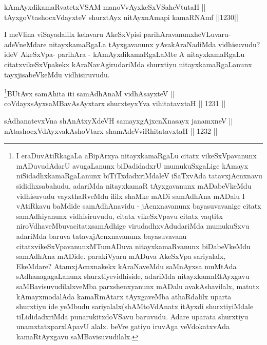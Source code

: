 \begin{shl}
kAmAyxdikamaRvatetxVSAM manoVvAyxkeSxVSaheVtutaH || \\
tAyxgoV\s tashocxVdayxteV shurxtAyx nitAyxnAmapi kamaRNAmf \hfill ||1230||  
\end{shl}

\begin{artha}
I meVlina viSayadalilx kelavaru AkeSxVpisi parihAravanunx\break heVLuvaru-adeVneMdare nitayxkamaRgaLa tAyxgavanunx yAvakAraNadiMda vidhisuvudu?ideV AkeSxVpa- parihAra - kAmAyxdikamaRgaLaMte A nitayxkamaRgaLu citatxvikeSxVpakekx kAraNavAgirudariMda shurxtiyu nitayxkamaRgaLanunx tayxjisabeVkeMdu vidhisiruvudu.
\end{artha}


\begin{shl}
\footnote{I eraDuvAtiRkagaLa aBipArxya nitayxkamaRgaLu citatx vikeSxVpavanunx mADuvudAdarU avugaLanunx biDadidadxrU mumukuSxgaLige kAmayx niSidadhxkamaRgaLanunx biTiTxdadxriMdaleV iSaTxvAda tatavxjAcnxnavu sididhxsabahudu, adariMda nitayxkamaR tAyxgavanunx mADabeVkeMdu vidhisuvudu vayxthaRveMdu ililx shaMke mADi samAdhAna  mADalu I vAtiRkavu baMdide samAdhAnavidu - jAcnxnavanunx bayasuvavanige citatx samAdhiyanunx vidhisiruvudu, citatx vikeSxVpavu citatx vaqtitx niroVdhaveMbuva\break citatxsamAdhige virudadhxvAdudariMda mumukuSxvu adariMda baruva tatavxjAcnxnavanunx bayasuvavanu citatxvikeSxVpavanunxMTumADuva nitayxkamaRvanunx biDabeVkeMdu samAdhAna mADide. parakiVyaru mADuva AkeSxVpa sariyalalx, EkeMdare? AtamxjAcnxnakekx kAraNaveMdu saMnAyxsa muMtAda sAdhanagagaLanunx shurxtiyevidhiside, adariMda nitayxkamaRtAyxgavu saMBavisuvudilalxveMba parxshenxyanunx mADalu avakAshavilalx, matutx kAmayxmodalAda kamaRmAtarx tAyxgaveMba athaRdalilx uparta shurxtiyu ide yeMbudu sariyalalx(shAMtoVdAnatx itAyxdi shurxtiyiMdale tiLididadxriMda punarukitxdoVSavu baruvudu. Adare uparata shurxtiyu unamxtatxparxlApavU alalx. beVre gatiyu iruvAga veVdokatxvAda kamaRtAyxgavu saMBavisuvudilalx.}BUtAvx samAhita iti samAdhAnaM vidhAsayxteV || \\
coVdayxsAyxsaMBavA\s sAyxtarx shurxteyxYva vihitatavxtaH \hfill || 1231 ||  
\end{shl}
				
\begin{shl}
sAdhanatevxVna shAnAtxyXdeVH samayxgAjxcnXnasayx janamxneV || \\
nAtashocxVdAyxvakAshoV\s tarx shamAdeVviRhitatavxtaH \hfill || 1232 ||  
\end{shl}

